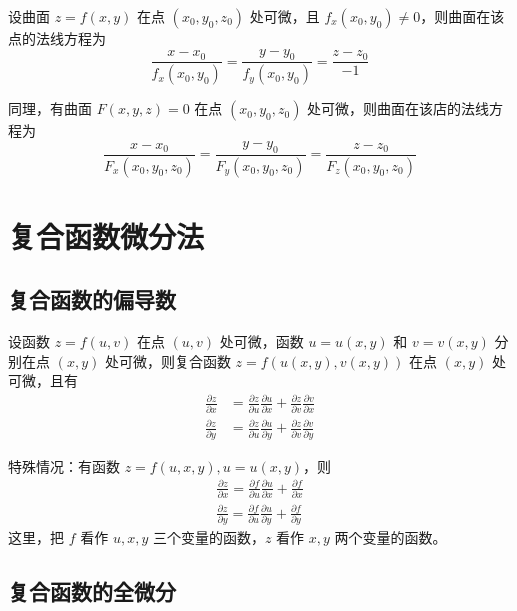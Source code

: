\begin{definition}
    设曲面 $z=f(x,y)$ 在点 $(x_0,y_0,z_0)$ 处可微，且 $f_x(x_0,y_0)\neq 0$，则曲面在该点的法线方程为
    \[
        \frac{x-x_0}{f_x(x_0,y_0)}=\frac{y-y_0}{f_y(x_0,y_0)}=\frac{z-z_0}{-1}
    \]
\end{definition}

同理，有曲面 $F(x,y,z)=0$ 在点 $(x_0,y_0,z_0)$ 处可微，则曲面在该店的法线方程为
\[
    \frac{x-x_0}{F_x(x_0,y_0,z_0)}=\frac{y-y_0}{F_y(x_0,y_0,z_0)}=\frac{z-z_0}{F_z(x_0,y_0,z_0)}
\]


\section{复合函数微分法}

\subsection{复合函数的偏导数}

\begin{theorem}
    设函数 $z=f(u,v)$ 在点 $(u,v)$ 处可微，函数 $u=u(x,y)$ 和 $v=v(x,y)$ 分别在点 $(x,y)$ 处可微，则复合函数 $z=f(u(x,y),v(x,y))$ 在点 $(x,y)$ 处可微，且有
    \[
        \begin{aligned}
            \frac{\partial z}{\partial x} & =\frac{\partial z}{\partial u}\frac{\partial u}{\partial x}+\frac{\partial z}{\partial v}\frac{\partial v}{\partial x} \\
            \frac{\partial z}{\partial y} & =\frac{\partial z}{\partial u}\frac{\partial u}{\partial y}+\frac{\partial z}{\partial v}\frac{\partial v}{\partial y}
        \end{aligned}
    \]
\end{theorem}

特殊情况：有函数 $z=f(u,x,y), u=u(x,y)$，则
\[
    \begin{aligned}
        \frac{\partial z}{\partial x}=\frac{\partial f}{\partial u}\frac{\partial u}{\partial x}+\frac{\partial f}{\partial x} \\
        \frac{\partial z}{\partial y}=\frac{\partial f}{\partial u}\frac{\partial u}{\partial y}+\frac{\partial f}{\partial y}
    \end{aligned}
\]
这里，把 $f$ 看作 $u,x,y$ 三个变量的函数，$z$ 看作 $x,y$ 两个变量的函数。

\subsection{复合函数的全微分}

